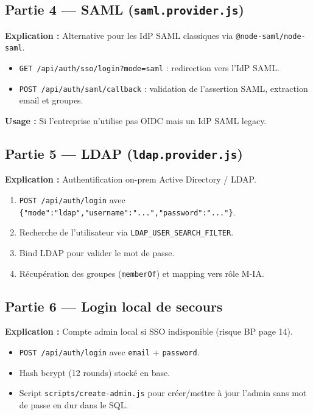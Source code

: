 \documentclass[12pt,a4paper]{article}
\begin{document}
\subsection{Partie 4 --- SAML (\texttt{saml.provider.js})}

\textbf{Explication :} Alternative pour les IdP SAML classiques via \texttt{@node-saml/node-saml}.

\begin{itemize}
  \item \texttt{GET /api/auth/sso/login?mode=saml} : redirection vers l'IdP SAML.
  \item \texttt{POST /api/auth/saml/callback} : validation de l'assertion SAML, extraction email et groupes.
\end{itemize}

\textbf{Usage :} Si l'entreprise n'utilise pas OIDC mais un IdP SAML legacy.

\subsection{Partie 5 --- LDAP (\texttt{ldap.provider.js})}

\textbf{Explication :} Authentification on-prem Active Directory / LDAP.

\begin{enumerate}
  \item \texttt{POST /api/auth/login} avec \texttt{\{"mode":"ldap","username":"...","password":"..."\}}.
  \item Recherche de l'utilisateur via \texttt{LDAP\_USER\_SEARCH\_FILTER}.
  \item Bind LDAP pour valider le mot de passe.
  \item Récupération des groupes (\texttt{memberOf}) et mapping vers rôle M-IA.
\end{enumerate}

\subsection{Partie 6 --- Login local de secours}

\textbf{Explication :} Compte admin local si SSO indisponible (risque BP page 14).

\begin{itemize}
  \item \texttt{POST /api/auth/login} avec \texttt{email} + \texttt{password}.
  \item Hash bcrypt (12 rounds) stocké en base.
  \item Script \texttt{scripts/create-admin.js} pour créer/mettre à jour l'admin sans mot de passe en dur dans le SQL.
\end{itemize}
\end{document}
